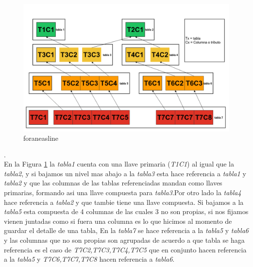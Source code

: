 \begin{figure}[hbtp]
\centering
\includegraphics[scale=0.4]{images/foraneasline.png}
\caption{foraneasline}\label{fig:ejemploForaneasLine}
\end{figure}.\\
En la Figura \ref{fig:ejemploForaneasLine} la \textit{tabla1} cuenta con una llave primaria (\textit{T1C1})  al igual que la \textit{tabla2}, y si bajamos un nivel mas abajo a la \textit{tabla3} esta hace referencia a \textit{tabla1} y \textit{tabla2} y que las columnas de las tablas referenciadas mandan como llaves primarias, formando asi una llave compuesta para \textit{tabla3}.Por otro lado la \textit{tabla4} hace referencia a \textit{tabla2} y que tambie tiene una llave compuesta. Si bajamos a la \textit{tabla5} esta compuesta de 4 columnas de las cuales 3 no son propias, si nos fijamos vienen juntadas como si fuera una columna es lo que hicimos al momento de guardar el detalle de una tabla, En la \textit{tabla7} se hace referencia a la \textit{tabla5} y \textit{tabla6} y las columnas que no son propias son agrupadas de acuerdo a que tabla se haga referencia es el caso de \textit{T7C2,T7C3,T7C4,T7C5} que en conjunto hacen referencia a la \textit{tabla5} y \textit{T7C6,T7C7,T7C8} hacen referencia a \textit{tabla6}.

